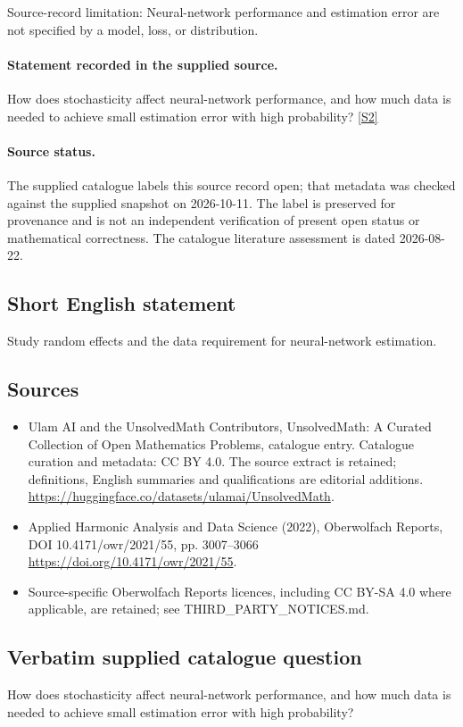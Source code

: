 \documentclass[11pt]{article}
\begin{document}
Source-record limitation: Neural-network performance and estimation error are not specified by a model, loss, or distribution.
\paragraph{Statement recorded in the supplied source.}
How does stochasticity affect neural-network performance, and how much data is needed to achieve small estimation error with high probability? \href{https://doi.org/10.4171/owr/2021/55}{[S2]}
\paragraph{Source status.}
The supplied catalogue labels this source record open; that metadata was checked against the supplied snapshot on 2026-10-11. The label is preserved for provenance and is not an independent verification of present open status or mathematical correctness. The catalogue literature assessment is dated 2026-08-22.
\subsection{Short English statement}
Study random effects and the data requirement for neural-network estimation.
\subsection{Sources}
\begin{itemize}
\item[S1] Ulam AI and the UnsolvedMath Contributors, UnsolvedMath: A Curated Collection of Open Mathematics Problems, catalogue entry. Catalogue curation and metadata: CC BY 4.0. The source extract is retained; definitions, English summaries and qualifications are editorial additions.
\url{https://huggingface.co/datasets/ulamai/UnsolvedMath}.
\item[S2] Applied Harmonic Analysis and Data Science (2022), Oberwolfach Reports, DOI 10.4171/owr/2021/55, pp. 3007--3066
\url{https://doi.org/10.4171/owr/2021/55}.
\item Source-specific Oberwolfach Reports licences, including CC BY-SA 4.0 where applicable, are retained; see THIRD\_PARTY\_NOTICES.md.
\end{itemize}
\subsection{Verbatim supplied catalogue question}
How does stochasticity affect neural-network performance, and how much data is needed to achieve small estimation error with high probability?
\end{document}
